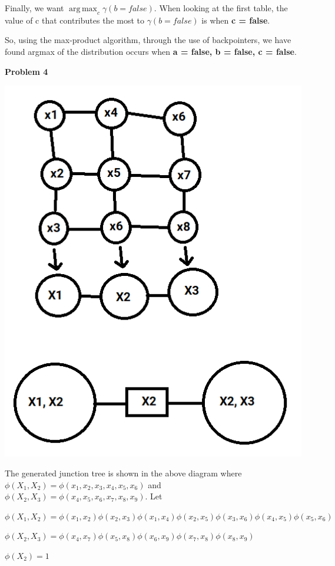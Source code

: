 \documentclass[12pt]{article}
\DeclareMathOperator*{\argmax}{arg\,max}
\begin{document}
Finally, we want $\argmax_c \gamma(b = false)$. When looking at the first table, the value of c that contributes the most to $\gamma(b = false)$ is when \textbf{c = false}.

So, using the max-product algorithm, through the use of backpointers, we have found argmax of the distribution occurs when \textbf{a = false, b = false, c = false}.

\pagebreak\textbf{Problem 4}

\includegraphics[scale=0.5]{q4}

The generated junction tree is shown in the above diagram where $\phi(X_1, X_2) = \phi(x_1, x_2, x_3, x_4, x_5, x_6)$ and $\phi(X_2, X_3) = \phi(x_4, x_5, x_6, x_7, x_8, x_9)$. Let 

$\phi(X_1, X_2) = \phi(x_1, x_2)\phi(x_2, x_3)\phi(x_1, x_4)\phi(x_2, x_5)\phi(x_3, x_6)\phi(x_4, x_5)\phi(x_5, x_6)$

$\phi(X_2, X_3) = \phi(x_4, x_7)\phi(x_5, x_8)\phi(x_6, x_9)\phi(x_7, x_8)\phi(x_8, x_9)$

$\phi(X_2) = 1$
\end{document}
